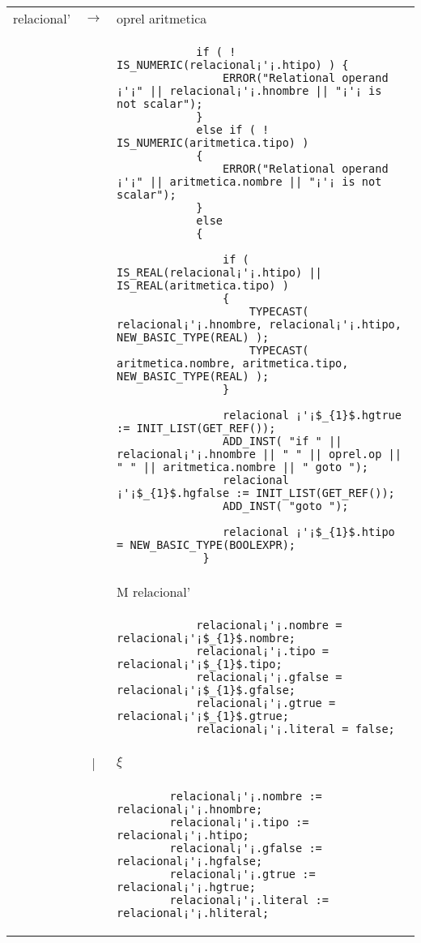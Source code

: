 \small
\begin{tabular}{r c p{}}

			relacional'			& $\longrightarrow$ 	& oprel aritmetica \\
								&					& \begin{lstlisting}
            if ( ! IS_NUMERIC(relacional¡'¡.htipo) ) {
            	ERROR("Relational operand ¡'¡" || relacional¡'¡.hnombre || "¡'¡ is not scalar");
            }
            else if ( ! IS_NUMERIC(aritmetica.tipo) )
            {
            	ERROR("Relational operand ¡'¡" || aritmetica.nombre || "¡'¡ is not scalar");
            }
            else
            {

                if ( IS_REAL(relacional¡'¡.htipo) || IS_REAL(aritmetica.tipo) )
                {
                    TYPECAST( relacional¡'¡.hnombre, relacional¡'¡.htipo, NEW_BASIC_TYPE(REAL) );
                    TYPECAST( aritmetica.nombre, aritmetica.tipo, NEW_BASIC_TYPE(REAL) );
                }

                relacional ¡'¡$_{1}$.hgtrue := INIT_LIST(GET_REF());
                ADD_INST( "if " || relacional¡'¡.hnombre || " " || oprel.op || " " || aritmetica.nombre || " goto ");
                relacional ¡'¡$_{1}$.hgfalse := INIT_LIST(GET_REF());
                ADD_INST( "goto ");

                relacional ¡'¡$_{1}$.htipo = NEW_BASIC_TYPE(BOOLEXPR);
             }
                    									\end{lstlisting} \\
								&					& M relacional' \\
								&					& \begin{lstlisting}
            relacional¡'¡.nombre = relacional¡'¡$_{1}$.nombre;
            relacional¡'¡.tipo = relacional¡'¡$_{1}$.tipo;
            relacional¡'¡.gfalse = relacional¡'¡$_{1}$.gfalse;
            relacional¡'¡.gtrue = relacional¡'¡$_{1}$.gtrue;
            relacional¡'¡.literal = false;
                    									\end{lstlisting} \\
									
								& | 					& $\xi$ \\
								&					& \begin{lstlisting}
        relacional¡'¡.nombre := relacional¡'¡.hnombre;
        relacional¡'¡.tipo := relacional¡'¡.htipo;
        relacional¡'¡.gfalse := relacional¡'¡.hgfalse;
        relacional¡'¡.gtrue := relacional¡'¡.hgtrue;
        relacional¡'¡.literal := relacional¡'¡.hliteral;
                    									\end{lstlisting} \\

\end{tabular}


